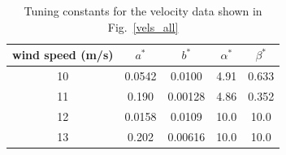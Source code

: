 \documentclass[11pt,letterpaper]{article}
\begin{document}
\begin{table}
\begin{center}
\caption{Tuning constants for the velocity data shown in Fig.~\ref{vels_all} \label{tune_vel}}
\begin{tabular}{c|cccc}
   wind speed (m/s) & $a^*$ & $b^*$ & $\alpha^*$ & $\beta^*$ \\ \midrule 
   10 & 0.0542 & 0.0100 & 4.91 & 0.633 \\
   11 & 0.190 & 0.00128 & 4.86 & 0.352 \\
   12 & 0.0158 & 0.0109 & 10.0 & 10.0 \\
   13 & 0.202 & 0.00616 & 10.0 & 10.0 \\
   
\end{tabular}
\end{center}
\end{table}
\end{document}
